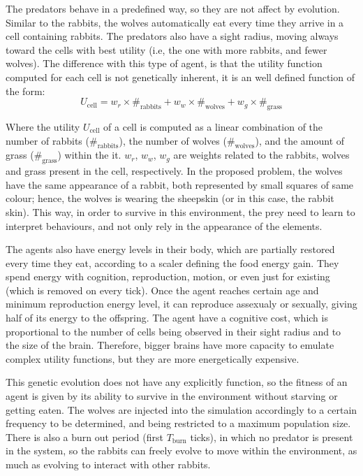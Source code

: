 \documentclass[letterpaper]{article}
\numberwithin{equation}{section}
\numberwithin{theorem}{section}
\numberwithin{lemma}{section}
\numberwithin{df}{section}
\begin{document}
The predators behave in a predefined way, so they are not affect by evolution. Similar to the rabbits, the wolves automatically eat every time they arrive in a cell containing rabbits. The predators also have a sight radius, moving always toward the cells with best utility (i.e, the one with more rabbits, and fewer wolves). The difference with this type of agent, is that the utility function computed for each cell is not genetically inherent, it is an well defined function of the form:
\begin{equation}
U_\text{cell} = w_r \times \#_\text{rabbits} + w_w \times \#_\text{wolves} + w_g \times \#_\text{grass}
\end{equation}

Where the utility $U_\text{cell}$ of a cell is computed as a linear combination of the number of rabbits ($\#_\text{rabbits}$), the number of wolves ($\#_\text{wolves}$), and the amount of grass ($\#_\text{grass}$) within the it. $w_r$, $w_w$, $w_g$ are weights related to the rabbits, wolves and grass present in the cell, respectively. In the proposed problem, the wolves have the same appearance of a rabbit, both represented by small squares of same colour; hence, the wolves is wearing the sheepskin (or in this case, the rabbit skin). This way, in order to survive in this environment, the prey need to learn to interpret behaviours, and not only rely in the appearance of the elements.

The agents also have energy levels in their body, which are partially restored every time they eat, according to a scaler defining the food energy gain. They spend energy with cognition, reproduction, motion, or even just for existing (which is removed on every tick). Once the agent reaches certain age and minimum reproduction energy level, it can reproduce assexualy or sexually, giving half of its energy to the offspring. The agent have a cognitive cost, which is proportional to the number of cells being observed in their sight radius and to the size of the brain. Therefore, bigger brains have more capacity to emulate complex utility functions, but they are more energetically expensive.

This genetic evolution does not have any explicitly function, so the fitness of an agent is given by its ability to survive in the environment without starving or getting eaten. The wolves are injected into the simulation accordingly to a certain frequency to be determined, and being restricted to a maximum population size. There is also a burn out period (first $T_{\text{burn}}$ ticks), in which no predator is present in the system, so the rabbits can freely evolve to move within the environment, as much as evolving to interact with other rabbits.
\end{document}
